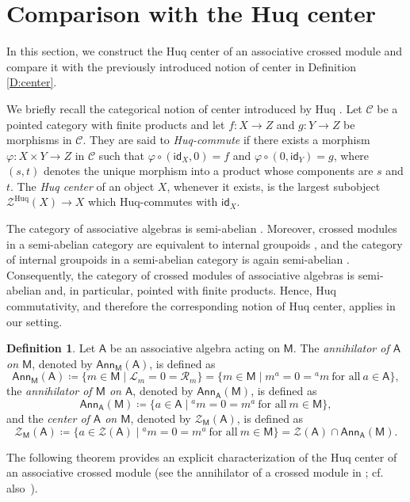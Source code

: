\documentclass[12pt,reqno]{amsart}
\theoremstyle{plain}
\theoremstyle{definition}
\newtheorem{definition}[theorem]{Definition}
\theoremstyle{remark}
\newcommand{\A}{\ensuremath{\mathsf{A}}}
\newcommand{\id}{\ensuremath{\mathsf{id}}}
\newcommand{\MM}{\ensuremath{\mathsf{M}}}
\newcommand{\ZZ}{\ensuremath{\mathscr{Z}}}
\newcommand{\Ann}{\ensuremath{\mathsf{Ann}}}
\newcommand{\LL}{\ensuremath{\mathcal{L}}}
\newcommand{\RR}{\ensuremath{\mathcal{R}}}
\numberwithin{equation}{section}
\begin{document}

\section{Comparison with the Huq center}\label{S:Huq}
In this section, we construct the Huq center of an associative crossed module and compare it with the previously introduced notion of center in Definition \ref{D:center}. 

We briefly recall the categorical notion of center introduced by Huq \cite{Huq}. Let $\mathcal{C}$ be a pointed category with finite products and 
let $f\colon X\to Z$ and $g\colon Y\to Z$ be morphisms in $\mathcal{C}$. They are said to \emph{Huq-commute} if there exists a morphism 
$\varphi\colon X\times Y\to Z$ in $\mathcal{C}$ such that $\varphi\circ(\id_X,0)=f$ and $\varphi\circ(0,\id_Y)=g$, where $(s,t)$
 denotes the unique morphism into a product whose components are $s$ and $t$. The \emph{Huq center} of an object $X$, whenever it exists,
  is the largest subobject $ \ZZ^{\mathrm{Huq}}(X)\rightarrow X$ which Huq-commutes with $\id_X$.

The category of associative algebras is semi-abelian \cite{JMT}. Moreover, crossed modules in a semi-abelian category are equivalent to internal groupoids \cite{J},
 and the category of internal groupoids in a semi-abelian category is again semi-abelian \cite{BG}. Consequently, the category of crossed modules of associative algebras is semi-abelian and,
  in particular, pointed with finite products. Hence, Huq commutativity, and therefore the corresponding notion of Huq center, applies in our setting.

\begin{definition}
		Let $\A$ be an associative algebra  acting on $\MM$.  The \emph{annihilator of $\A$ on $\MM$}, denoted by
		$\Ann_{\MM}(\A)$, is defined as
		\[ \Ann_{\MM}(\A) \coloneqq \{m \in \MM \mid \LL_m=0= \RR_m \}= \{m \in \MM \mid  m^a =0= {}^a m \ \text{for all} \  a \in \A \},\]
		the \emph{annihilator of $\MM$ on $\A$}, denoted by
		$\Ann_{\A}(\MM)$, is defined as
		\[ \Ann_{\A}(\MM) \coloneqq  \{a \in \A \mid  {}^a m=0= m^a \ \text{for all} \  m \in \MM \},\]
		and the \emph{center of $\A$ on $\MM$},  denoted by
		$\ZZ_{\MM}(\A)$, is defined as
		\[ \ZZ_{\MM}(\A) \coloneqq \{a \in \ZZ(\A) \mid {}^a m=0= m^a \ \text{for all} \  m \in \MM \}= \ZZ(\A) \cap \Ann_{\A}(\MM).\]
	\end{definition} 

The following theorem provides an explicit characterization of the Huq center of an associative crossed module (see the annihilator of a crossed module in \cite{AH}; cf. also~\cite{UCA}).
\end{document}
